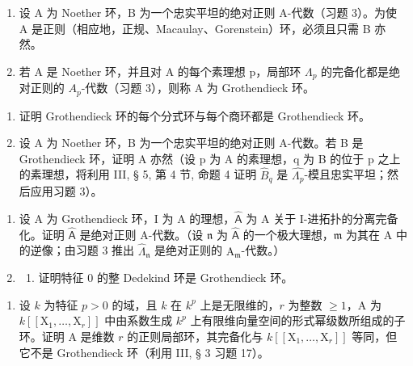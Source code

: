 \begin{enumerate}
\def\labelenumi{\arabic{enumi})}
\setcounter{enumi}{3}
\item
  设 A 为 Noether 环，B 为一个忠实平坦的绝对正则 A-代数（习题 3）。为使 A 是正则（相应地，正规、Macaulay、Gorenstein）环，必须且只需 B 亦然。
\item
  若 A 是 Noether 环，并且对 A 的每个素理想 p，局部环 \(\Lambda_{p}\) 的完备化都是绝对正则的 \(A_{p}\)-代数（习题 3），则称 A 为 Grothendieck 环。
\end{enumerate}

\begin{enumerate}
\def\labelenumi{\alph{enumi})}
\item
  证明 Grothendieck 环的每个分式环与每个商环都是 Grothendieck 环。
\item
  设 A 为 Noether 环，B 为一个忠实平坦的绝对正则 A-代数。若 B 是 Grothendieck 环，证明 A 亦然（设 p 为 A 的素理想，q 为 B 的位于 p 之上的素理想，将利用 III, § 5, 第 4 节, 命题 4 证明 \(\widehat{B}_{q}\) 是 \(\widehat{\Lambda_{p}}\)-模且忠实平坦；然后应用习题 3）。
\end{enumerate}

\begin{enumerate}
\def\labelenumi{\arabic{enumi})}
\setcounter{enumi}{5}
\item
  设 A 为 Grothendieck 环，I 为 A 的理想，\(\widehat{\mathsf{A}}\) 为 A 关于 I-进拓扑的分离完备化。证明 \(\widehat{\mathsf{A}}\) 是绝对正则 A-代数。（设 \(\mathfrak{n}\) 为 \(\widehat{\mathsf{A}}\) 的一个极大理想，\(\mathfrak{m}\) 为其在 A 中的逆像；由习题 3 推出 \(\widehat{\Lambda}_{\mathfrak{n}}\) 是绝对正则的 \(\mathrm{A}_{\mathfrak{m}}\)-代数。）
\item
  \begin{enumerate}
  \def\labelenumii{\alph{enumii})}
  \tightlist
  \item
    证明特征 0 的整 Dedekind 环是 Grothendieck 环。
  \end{enumerate}
\end{enumerate}

\begin{enumerate}
\def\labelenumi{\alph{enumi})}
\setcounter{enumi}{1}
\tightlist
\item
  设 \(k\) 为特征 \(p > 0\) 的域，且 \(k\) 在 \(k^p\) 上是无限维的，\(r\) 为整数 \(\geqslant 1\)，A 为 \(k[[\mathrm{X}_1, \ldots, \mathrm{X}_r]]\) 中由系数生成 \(k^p\) 上有限维向量空间的形式幂级数所组成的子环。证明 A 是维数 \(r\) 的正则局部环，其完备化与 \(k[[\mathrm{X}_1, \ldots, \mathrm{X}_r]]\) 等同，但它不是 Grothendieck 环（利用 III, § 3 习题 17）。
\end{enumerate}

